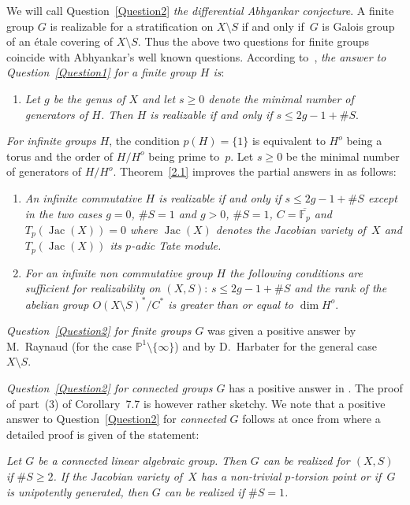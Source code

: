 \documentclass[10pt,a4paper]{amsart}
\numberwithin{equation}{section}
\begin{document}
We will call Question~\ref{Question2} {\it the differential Abhyankar conjecture}. A finite group $G$ is realizable for a stratification on $X\setminus S$ if and only if~$G$ is Galois group of an \'etale covering of $X\setminus S$. Thus the above two questions for finite groups coincide with Abhyankar's well known questions. According to~\cite{SGA1}, {\it the answer to Question~{\rm \ref{Question1}} for a finite group $H$ is}:
\begin{enumerate}\itemsep=0pt
\item[(a)] {\it Let $g$ be the genus of $X$ and let $s\geq 0$ denote the minimal number of generators of $H$. Then $H$ is realizable if and only if $s\leq 2g-1+\#S$}.
\end{enumerate}
{\it For infinite groups $H$}, the condition $p(H)=\{1\}$ is equivalent to $H^o$ being a torus and the order of $H/H^o$ being prime to~$p$. Let $s\geq 0$ be the minimal number of generators of $H/H^o$. Theorem~\ref{2.1} improves the partial answers in \cite[Theorems~7.1 and~7.2]{Ma-vdP1} as follows:
\begin{enumerate}\itemsep=0pt
\item[(b)] {\it An infinite commutative $H$ is realizable if and only if $s\leq 2g-1+\#S$ except in the two cases
 $g=0$, $\#S=1$ and $g>0$, $\# S=1$, $C=\overline{\mathbb{F}_p}$ and $T_p(\operatorname{Jac}(X))=0$ where $\operatorname{Jac}(X)$ denotes the Jacobian variety of~$X$ and $T_p(\operatorname{Jac}(X))$ its $p$-adic Tate module.}
\item[(c)] {\it For an infinite non commutative group $H$ the following conditions are sufficient for reali\-za\-bility on $(X,S)$}: {\it $s\leq 2g-1+\#S$ and
 the rank of the abelian group $O(X\setminus S)^*/C^*$ is greater than or equal to $\dim H^o$}.
\end{enumerate}

{\it Question~{\rm \ref{Question2}} for finite groups $G$} was given a positive answer by M.~Raynaud (for the case $\mathbb{P}^1\setminus \{\infty \}$) and by D.~Harbater for the general case~$X\setminus S$.

{\it Question~{\rm \ref{Question2}} for connected groups $G$} has a positive answer in \cite[Corollary~7.7]{Ma-vdP1}. The proof of part~(3) of Corollary~7.7 is however rather sketchy. We note that a positive answer to Question~\ref{Question2} for {\it connected} $G$ follows at once from \cite[Theorem 9.12] {R} where a detailed proof is given of the statement:

{\it Let $G$ be a connected linear algebraic group. Then $G$ can be realized for $(X,S)$ if $\#S\geq 2$. If the Jacobian variety of~$X$ has a non-trivial $p$-torsion point or if~$G$ is unipotently generated, then $G$ can be realized if $\#S=1$.}
\end{document}
